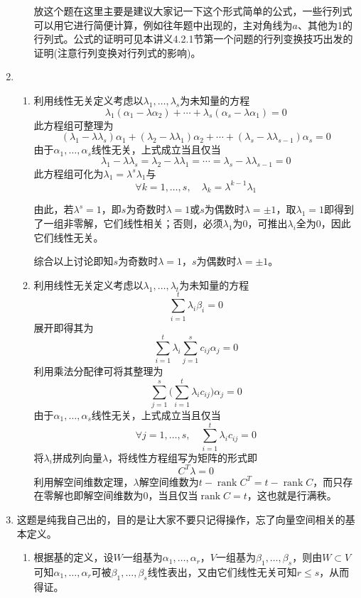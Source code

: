 \documentclass[a4paper,UTF8,fontset=windows]{ctexart}
\DeclareMathOperator{\rank}{rank}
\newcommand*{\note}{\noindent *}
\begin{document}
\begin{enumerate}
\begin{enumerate}[(1)]
        \note 放这个题在这里主要是建议大家记一下这个形式简单的公式，一些行列式可以用它进行简便计算，例如往年题中出现的，主对角线为$a$、其他为1的行列式。公式的证明可见本讲义4.2.1节第一个问题的行列变换技巧出发的证明(注意行列变换对行列式的影响)。
    \end{enumerate}

    \item
    \begin{enumerate}[(1)]
        \item 利用线性无关定义考虑以$\lambda_1,\dots,\lambda_s$为未知量的方程
        $$\lambda_1(\alpha_1-\lambda\alpha_2)+\cdots+\lambda_s(\alpha_s-\lambda\alpha_1)=0$$
        此方程组可整理为
        $$(\lambda_1-\lambda\lambda_s)\alpha_1+(\lambda_2-\lambda\lambda_1)\alpha_2+\cdots+(\lambda_s-\lambda\lambda_{s-1})\alpha_s=0$$
        由于$\alpha_1,\dots,\alpha_s$线性无关，上式成立当且仅当
        $$\lambda_1-\lambda\lambda_s=\lambda_2-\lambda\lambda_1=\cdots=\lambda_s-\lambda\lambda_{s-1}=0$$
        此方程组可化为$\lambda_1=\lambda^s\lambda_1$与
        $$\forall k=1,\dots,s,\quad\lambda_k=\lambda^{k-1}\lambda_1$$

        由此，若$\lambda^s=1$，即$s$为奇数时$\lambda=1$或$s$为偶数时$\lambda=\pm1$，取$\lambda_1=1$即得到了一组非零解，它们线性相关；否则，必须$\lambda_1$为0，可推出$\lambda_i$全为0，因此它们线性无关。

        综合以上讨论即知$s$为奇数时$\lambda=1$，$s$为偶数时$\lambda=\pm1$。

        \item 利用线性无关定义考虑以$\lambda_1,\dots,\lambda_t$为未知量的方程
        $$\sum_{i=1}^t\lambda_i\beta_i=0$$
        展开即得其为
        $$\sum_{i=1}^t\lambda_i\sum_{j=1}^sc_{ij}\alpha_j=0$$
        利用乘法分配律可将其整理为
        $$\sum_{j=1}^s\bigg(\sum_{i=1}^t\lambda_ic_{ij}\bigg)\alpha_j=0$$
        由于$\alpha_1,\dots,\alpha_s$线性无关，上式成立当且仅当
        $$\forall j=1,\dots,s,\quad\sum_{i=1}^t\lambda_ic_{ij}=0$$
        将$\lambda_i$拼成列向量$\lambda$，将线性方程组写为矩阵的形式即
        $$C^T\lambda=0$$
        利用解空间维数定理，$\lambda$解空间维数为$t-\rank C^T=t-\rank C$，而只存在零解也即解空间维数为0，当且仅当$\rank C=t$，这也就是行满秩。
    \end{enumerate}

    \item
    \note 这题是纯我自己出的，目的是让大家不要只记得操作，忘了向量空间相关的基本定义。
    \begin{enumerate}[(1)]
        \item 根据基的定义，设$W$一组基为$\alpha_1,\dots,\alpha_r$，$V$一组基为$\beta_1,\dots,\beta_s$，则由$W\subset V$可知$\alpha_1,\dots,\alpha_r$可被$\beta_1,\dots,\beta_s$线性表出，又由它们线性无关可知$r\le s$，从而得证。
        

\end{enumerate}
\end{enumerate}
\end{document}
